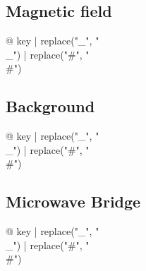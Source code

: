 \begin{multicols}{2}
\subsection{Magnetic field}

\begin{description}
\item[{@ key | replace("_", "\\_") | replace("#", "\\#") }] %
\end{description}

\subsection{Background}

\begin{description}
\item[{@ key | replace("_", "\\_") | replace("#", "\\#") }] %
\end{description}

\subsection{Microwave Bridge}

\begin{description}
\item[{@ key | replace("_", "\\_") | replace("#", "\\#") }] %
\end{description}


\end{multicols}
